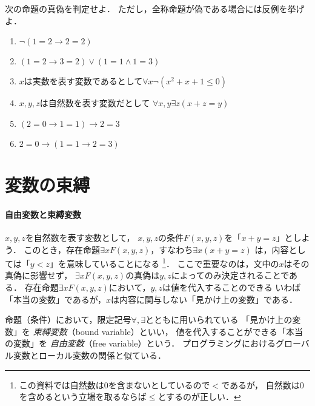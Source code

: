   \begin{que} \label{chp:sequent.sec:ronri.que:singihantei}
      次の命題の真偽を判定せよ．
      ただし，全称命題が偽である場合には反例を挙げよ．
        \begin{enumerate}
          \item $\lnot ( 1=2 \to 2=2)$ %
          \item $(1=2 \to 3=2) \lor ( 1=1 \land 1=3)$ %
          \item $x$は実数を表す変数であるとして$\forall x  \lnot ( x^2+x+1 \leq 0 )$ %
          \item $x,  y,  z$は自然数を表す変数だとして
                $\forall x, y \exists z ( x + z =y)$ %
          \item $(2=0 \to 1=1) \to 2=3$ %
          \item $2=0 \to ( 1=1 \to 2=3)$ %
        \end{enumerate}
  \end{que}
 \section{変数の束縛}
 \label{sec:hensuu}

\paragraph{自由変数と束縛変数}
 $x,  y,  z$を自然数を表す変数として，
 $x,  y,  z$の条件$F(x,y,z)$を「$x+y=z$」としよう．
 このとき，存在命題$\exists x F(x,y,z)$，すなわち$\exists x ( x + y =z)$
 は，内容としては「$y < z$」を意味していることになる
 \footnote{この資料では自然数は0を含まないとしているので$<$であるが，
 自然数は0を含めるという立場を取るならば$\leq$とするのが正しい．}．
 ここで重要なのは，文中の$x$はその真偽に影響せず，
 $\exists x F(x,y,z)$の真偽は$y,  z$によってのみ決定されることである．
 存在命題$\exists x F(x,y,z)$において，$y,  z$は値を代入することのできる
 いわば「本当の変数」であるが，$x$は内容に関与しない「見かけ上の変数」である．

 命題（条件）において，限定記号$\forall ,  \exists$とともに用いられている
 「見かけ上の変数」を
 \emph{束縛変数}（bound variable）といい，
 値を代入することができる「本当の変数」を
 \emph{自由変数}（free variable）という．
 プログラミングにおけるグローバル変数とローカル変数の関係と似ている．

